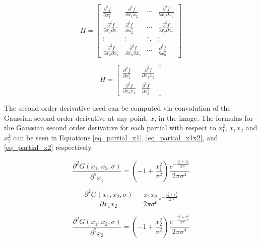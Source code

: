 \documentclass{article}
\begin{document}
\begin{equation}
H = \begin{bmatrix}
\frac{\partial^2 f}{\partial x_1^2} & \frac{\partial^2 f}{\partial x_1 x_2} & \cdots & \frac{\partial^2 f}{\partial x_1 \partial x_n} \\
\frac{\partial^2 f}{\partial x_2 \partial x_1} & \frac{\partial^2 f}{\partial x_2^2} & \cdots & \frac{\partial^2 f}{\partial x_2 \partial x_2} \\
\vdots & \vdots & \ddots & \vdots \\
\frac{\partial^2 f}{\partial x_n \partial x_1} & \frac{\partial^2 f}{\partial x_n \partial x_2} & \cdots & \frac{\partial^2 f}{\partial x_n^2}
\end{bmatrix}
\label{eq_hessian_general}
\end{equation}

\begin{equation}
H = \begin{bmatrix}
\frac{\partial^2 f}{\partial x_1^2} & \frac{\partial^2 f}{\partial x_1 x_2} \\
\frac{\partial^2 f}{\partial x_2 x_1} & \frac{\partial^2 f}{\partial x_2^2}
\end{bmatrix}
\label{eq_hessian_r2}
\end{equation}

The second order derivative used can be computed via convolution of the Gaussian second order derivative at any point, $x$, in the image. The formulas for the Gaussian second order derivative for each partial with respect to $x_1^2$, $x_1 x_2$ and $x_2^2$ can be seen in Equations \ref{eq_partial_x1}, \ref{eq_partial_x1x2}, and \ref{eq_partial_x2} respectively.

\begin{equation}
\frac{\partial^2 G(x_1,x_2,\sigma)}{\partial^2 x_1} = (-1 + \frac{x_1^2}{\sigma^2})\frac{e^{-\frac{x_1^2+x_2^2}{2\sigma^2}}}{2\pi \sigma^4}
\label{eq_partial_x1}
\end{equation}

\begin{equation}
\frac{\partial^2 G(x_1,x_2,\sigma)}{\partial x_1 x_2} = \frac{x_1 x_2}{2 \pi \sigma^6}e^{-\frac{x_1^2 + x_2^2}{2 \sigma^2}}
\label{eq_partial_x1x2}
\end{equation}

\begin{equation}
\frac{\partial^2 G(x_1,x_2,\sigma)}{\partial^2 x_2} = (-1 + \frac{x_2^2}{\sigma^2})\frac{e^{-\frac{x_1^2+x_2^2}{2\sigma^2}}}{2\pi \sigma^4}
\label{eq_partial_x2}
\end{equation}
\end{document}
